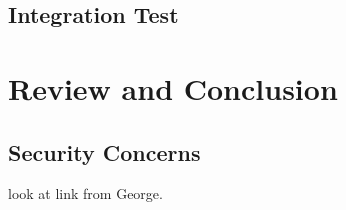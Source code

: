 \documentclass[a4paper, 11pt]{article}
\begin{document}
\subsection{Integration Test}

\section{Review and Conclusion}
\subsection{Security Concerns} look at link from George. 



\vspace{\baselineskip}
\vspace{\baselineskip}
\vspace{\baselineskip}
\end{document}
